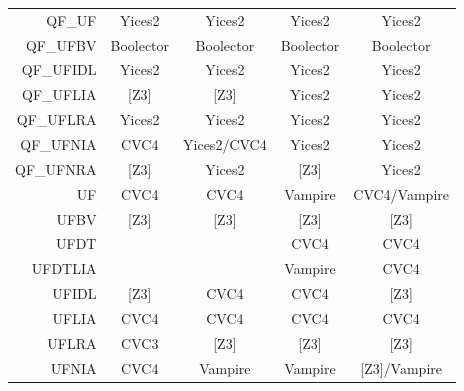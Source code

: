 \begin{table}
{\begin{tabular}{r@{\hskip 3em}c@{\hskip 2em}c@{\hskip 2em}c@{\hskip 2em}c}
QF\_UF       & {Yices2}        & {Yices2}        & {Yices2}               & {Yices2}              \\
QF\_UFBV     & {Boolector}     & {Boolector}     & {Boolector}            & {Boolector}           \\
QF\_UFIDL    & {Yices2}        & {Yices2}        & {Yices2}               & {Yices2}              \\
QF\_UFLIA    & {{[}Z3{]}}      & {{[}Z3{]}}      & {Yices2}               & {Yices2}              \\
QF\_UFLRA    & {Yices2}        & {Yices2}        & {Yices2}               & {Yices2}              \\
QF\_UFNIA    & {CVC4}          & {Yices2/CVC4}   & {Yices2}               & {Yices2}              \\
QF\_UFNRA    & {{[}Z3{]}}      & {Yices2}        & {{[}Z3{]}}             & {Yices2}              \\
UF           & {CVC4}          & {CVC4}          & {Vampire}              & {CVC4/Vampire}        \\
UFBV         & {{[}Z3{]}}      & {{[}Z3{]}}      & {{[}Z3{]}}             & {{[}Z3{]}}            \\
UFDT         &                 &                 & {CVC4}                 & {CVC4}                \\
UFDTLIA      &                 &                 & {Vampire}              & {CVC4}                \\
UFIDL        & {{[}Z3{]}}      & {CVC4}          & {CVC4}                 & {{[}Z3{]}}            \\
UFLIA        & {CVC4}          & {CVC4}          & {CVC4}                 & {CVC4}                \\
UFLRA        & {CVC3}          & {{[}Z3{]}}      & {{[}Z3{]}}             & {{[}Z3{]}}            \\
UFNIA        & {CVC4}          & {Vampire}       & {Vampire}              & {{[}Z3{]}/Vampire}    \\
\bottomrule
\end{tabular}}
\end{table}
